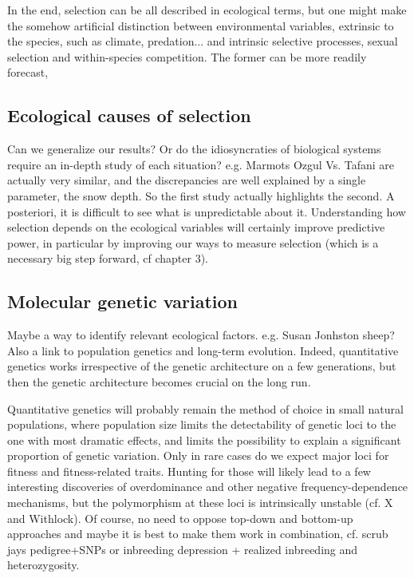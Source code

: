 In the end, selection can be all described in ecological terms, but one might make the somehow artificial distinction between environmental variables, extrinsic to the species, such as climate, predation... and intrinsic selective processes, sexual selection and within-species competition. 
The former can be more readily forecast, 

\subsection{Ecological causes of selection}

Can we generalize our results? Or do the idiosyncraties of biological systems require an in-depth study of each situation? 
e.g. Marmots Ozgul Vs. Tafani are actually very similar, and the discrepancies are well explained by a single parameter, the snow depth. So the first study actually highlights the second. A posteriori, it is difficult to see what is unpredictable about it.
Understanding how selection depends on the ecological variables will certainly improve predictive power, in particular by improving our ways to measure selection (which is a necessary big step forward, cf chapter 3).

\subsection{Molecular genetic variation}
Maybe a way to identify relevant ecological factors. e.g. Susan Jonhston sheep? 
Also a link to population genetics and long-term evolution. 
Indeed, quantitative genetics works irrespective of the genetic architecture on a few generations, but then the genetic architecture becomes crucial on the long run.

Quantitative genetics will probably remain the method of choice in small natural populations, where population size limits the detectability of genetic loci to the one with most dramatic effects, and limits the possibility to explain a significant proportion of genetic variation. 
Only in rare cases do we expect major loci for fitness and fitness-related traits. Hunting for those will likely lead to a few interesting discoveries of overdominance and other negative frequency-dependence mechanisms, but the polymorphism at these loci is intrinsically unstable (cf. X and Withlock). 
Of course, no need to oppose top-down and bottom-up approaches and maybe it is best to make them work in combination, cf. scrub jays pedigree+SNPs or inbreeding depression + realized inbreeding and heterozygosity. 


